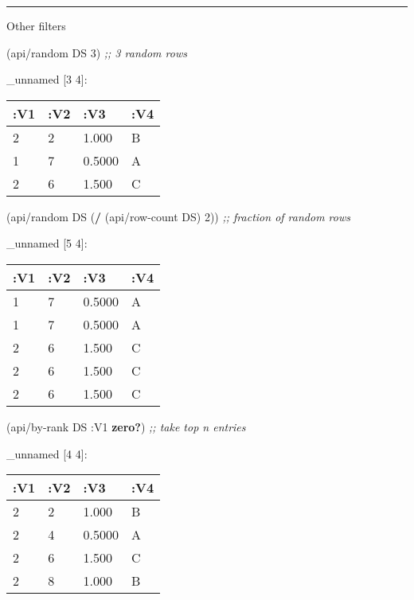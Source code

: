 \documentclass[]{article}
\newenvironment{Shaded}{\begin{snugshade}}{\end{snugshade}}
\newcommand{\KeywordTok}[1]{\textcolor[rgb]{0.13,0.29,0.53}{\textbf{#1}}}
\newcommand{\DecValTok}[1]{\textcolor[rgb]{0.00,0.00,0.81}{#1}}
\newcommand{\CommentTok}[1]{\textcolor[rgb]{0.56,0.35,0.01}{\textit{#1}}}
\newcommand{\AttributeTok}[1]{\textcolor[rgb]{0.77,0.63,0.00}{#1}}
\newcommand{\NormalTok}[1]{#1}
\begin{document}
\begin{center}\rule{0.5\linewidth}{0.5pt}\end{center}

Other filters

\begin{Shaded}
\begin{Highlighting}[]
\NormalTok{(api/random DS }\DecValTok{3}\NormalTok{) }\CommentTok{;; 3 random rows}
\end{Highlighting}
\end{Shaded}

\_unnamed {[}3 4{]}:

\begin{longtable}[]{@{}llll@{}}
\toprule
:V1 & :V2 & :V3 & :V4\tabularnewline
\midrule
\endhead
2 & 2 & 1.000 & B\tabularnewline
1 & 7 & 0.5000 & A\tabularnewline
2 & 6 & 1.500 & C\tabularnewline
\bottomrule
\end{longtable}

\begin{Shaded}
\begin{Highlighting}[]
\NormalTok{(api/random DS (}\KeywordTok{/}\NormalTok{ (api/row-count DS) }\DecValTok{2}\NormalTok{)) }\CommentTok{;; fraction of random rows}
\end{Highlighting}
\end{Shaded}

\_unnamed {[}5 4{]}:

\begin{longtable}[]{@{}llll@{}}
\toprule
:V1 & :V2 & :V3 & :V4\tabularnewline
\midrule
\endhead
1 & 7 & 0.5000 & A\tabularnewline
1 & 7 & 0.5000 & A\tabularnewline
2 & 6 & 1.500 & C\tabularnewline
2 & 6 & 1.500 & C\tabularnewline
2 & 6 & 1.500 & C\tabularnewline
\bottomrule
\end{longtable}

\begin{Shaded}
\begin{Highlighting}[]
\NormalTok{(api/by-rank DS }\AttributeTok{:V1} \KeywordTok{zero?}\NormalTok{) }\CommentTok{;; take top n entries}
\end{Highlighting}
\end{Shaded}

\_unnamed {[}4 4{]}:

\begin{longtable}[]{@{}llll@{}}
\toprule
:V1 & :V2 & :V3 & :V4\tabularnewline
\midrule
\endhead
2 & 2 & 1.000 & B\tabularnewline
2 & 4 & 0.5000 & A\tabularnewline
2 & 6 & 1.500 & C\tabularnewline
2 & 8 & 1.000 & B\tabularnewline
\bottomrule
\end{longtable}
\end{document}
